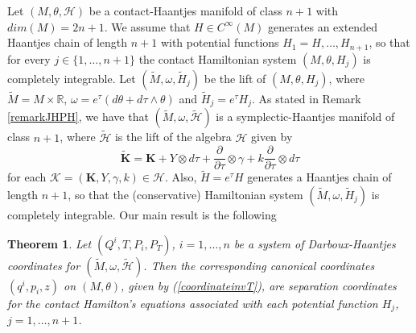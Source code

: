 \documentclass[10pt]{amsart}
\numberwithin{equation}{section}
\newcommand{\bs}{\boldsymbol}
\newtheorem{theorem}{Theorem}
\theoremstyle{definition}
\begin{document}
Let $(M,\theta,\mathscr{H})$ be a contact-Haantjes manifold of class $n+1$ with $dim(M)=2n+1$. We assume that $H\in C^{\infty}(M)$ generates an extended Haantjes chain of length $n+1$ with potential functions $H_{1}=H,\ldots,H_{n+1}$, so that for every $j\in\lbrace 1,\ldots,n+1\rbrace$ the contact Hamiltonian system $(M,\theta,H_{j})$ is completely integrable. Let $(\tilde{M},\omega,\tilde{H}_{j})$ be the lift of $(M,\theta,H_{j})$, where $\tilde{M}=M\times\mathbb{R}$, $\omega=e^{\tau}(d\theta+d\tau\wedge \theta)$ and $\tilde{H}_{j}=e^{\tau}H_{j}$. As stated in Remark \ref{remarkJHPH}, we have that $(\tilde{M},\omega,\tilde{\mathscr{H}})$ is a symplectic-Haantjes manifold of class $n+1$,  where $\tilde{\mathscr{H}}$ is the lift of the algebra $\mathscr{H}$ given by
\begin{equation}
\label{Ktildecontact}
\tilde{\bs{K}}=\bs{K}+Y\otimes d\tau+\frac{\partial}{\partial \tau}\otimes\gamma+k\frac{\partial}{\partial \tau}\otimes d\tau
\end{equation}
for each $\bs{\mathcal{K}}=(\bs{K}, Y, \gamma, k)\in\mathscr{H}$. Also, $\tilde{H}=e^{\tau}H$ generates a Haantjes chain of length $n+1$, so that the (conservative) Hamiltonian system $(\tilde{M},\omega,\tilde{H}_{j})$ is completely integrable.
Our main result is the following
\begin{theorem} \label{theo:4}
Let $(Q^{i},T,P_{i},P_{T})$, $i=1,\ldots, n$ be a system of Darboux-Haantjes coordinates for $(\tilde{M},\omega,\tilde{\mathscr{H}})$. Then the corresponding canonical coordinates $(q^{i},p_{i},z)$ on $(M,\theta)$, given by (\ref{coordinateinvT}), are separation coordinates for the contact Hamilton's equations associated with each potential function $H_{j}$, $j=1,\ldots,n+1$. 
\end{theorem}
\end{document}
